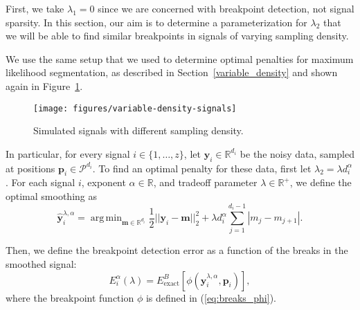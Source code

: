 \documentclass{jsfds} %
\DeclareMathOperator*{\argmin}{arg\,min}
\newcommand{\RR}{\mathbb{R}}
\begin{document}
First, we take $\lambda_1=0$ since we are concerned with breakpoint
detection, not signal sparsity. In this section, our aim is to
determine a parameterization for $\lambda_2$ that we will be able to
find similar breakpoints in signals of varying sampling density.

We use the same setup that we used to determine optimal penalties for
maximum likelihood segmentation, as described in
Section~\ref{variable_density} and shown again in
Figure~\ref{fig:variable-density-signals-flsa}.

\begin{figure}[h]
  \centering
  \texttt{[image: figures/variable-density-signals]}
  \caption{Simulated signals with different
  sampling density.}
  \label{fig:variable-density-signals-flsa}
\end{figure}

\newpage

In particular, for every signal $i\in\{1,\dots,z\}$, let
$\mathbf y_i\in\RR^{d_i}$ be the noisy data, sampled at positions
$\mathbf p_i\in\mathcal P^{d_i}$. To find an optimal penalty for these data,
first let $\lambda_2 = \lambda d_i^\alpha$. For each signal $i$,
exponent $\alpha\in\RR$, and tradeoff parameter $\lambda\in\RR^+$, we
define the optimal smoothing as
\begin{equation}
  \label{eq:flsa_lambda}
  \mathbf{\hat y}^{\lambda,\alpha}_i = 
\argmin_{\mathbf m\in\RR^{d_i}} 
\frac 1 2 ||\mathbf y_i-\mathbf m||_2^2
+\lambda d_i^\alpha \sum_{j=1}^{d_i-1} |m_j - m_{j+1}|.
\end{equation}

Then, we define the breakpoint detection error as a function of the
breaks in the smoothed signal:
\begin{equation}
  \label{eq:flsa_e_i_alpha}
  E_i^\alpha(\lambda) = 
E^B_{\text{exact}}
\left[
\phi\left(
\mathbf{\hat y}^{\lambda,\alpha}_i, \mathbf p_i
\right)
\right],
\end{equation}
where the breakpoint function $\phi$ is defined in
(\ref{eq:breaks_phi}).
\end{document}
